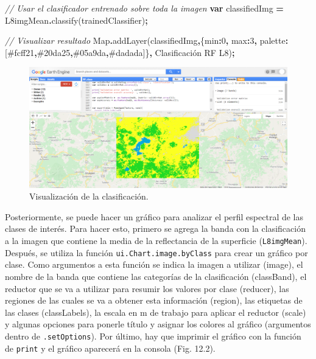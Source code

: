 \documentclass[
  12pt,
  letterpaper,
  twoside]{book}
\newenvironment{Shaded}{\begin{snugshade}}{\end{snugshade}}
\newcommand{\BuiltInTok}[1]{#1}
\newcommand{\CommentTok}[1]{\textcolor[rgb]{0.56,0.35,0.01}{\textit{#1}}}
\newcommand{\DataTypeTok}[1]{\textcolor[rgb]{0.13,0.29,0.53}{#1}}
\newcommand{\DecValTok}[1]{\textcolor[rgb]{0.00,0.00,0.81}{#1}}
\newcommand{\FunctionTok}[1]{\textcolor[rgb]{0.00,0.00,0.00}{#1}}
\newcommand{\KeywordTok}[1]{\textcolor[rgb]{0.13,0.29,0.53}{\textbf{#1}}}
\newcommand{\NormalTok}[1]{#1}
\newcommand{\OperatorTok}[1]{\textcolor[rgb]{0.81,0.36,0.00}{\textbf{#1}}}
\newcommand{\StringTok}[1]{\textcolor[rgb]{0.31,0.60,0.02}{#1}}
\begin{document}
\begin{Shaded}
\begin{Highlighting}[]
\CommentTok{// Usar el clasificador entrenado sobre toda la imagen}
\KeywordTok{var}\NormalTok{ classifiedImg }\OperatorTok{=}\NormalTok{ L8imgMean}\OperatorTok{.}\FunctionTok{classify}\NormalTok{(trainedClassifier)}\OperatorTok{;}

\CommentTok{// Visualizar resultado}
\BuiltInTok{Map}\OperatorTok{.}\FunctionTok{addLayer}\NormalTok{(classifiedImg}\OperatorTok{,}\NormalTok{\{}\DataTypeTok{min}\OperatorTok{:}\DecValTok{0}\OperatorTok{,} \DataTypeTok{max}\OperatorTok{:}\DecValTok{3}\OperatorTok{,} 
  \DataTypeTok{palette}\OperatorTok{:}\NormalTok{[}\StringTok{\textquotesingle{}\#fcff21\textquotesingle{}}\OperatorTok{,}\StringTok{\textquotesingle{}\#20da25\textquotesingle{}}\OperatorTok{,}\StringTok{\textquotesingle{}\#05a9da\textquotesingle{}}\OperatorTok{,}\StringTok{\textquotesingle{}\#dadada\textquotesingle{}}\NormalTok{]\}}\OperatorTok{,}
  \StringTok{\textquotesingle{}Clasificación RF L8\textquotesingle{}}\NormalTok{)}\OperatorTok{;}
\end{Highlighting}
\end{Shaded}

\begin{figure}[btp]

{\centering \includegraphics[width=1\linewidth]{Img/RFClass} 

}

\caption{Visualización de la clasificación.}\label{fig:unnamed-chunk-199}
\end{figure}

Posteriormente, se puede hacer un gráfico para analizar el perfil espectral de las clases de interés. Para hacer esto, primero se agrega la banda con la clasificación a la imagen que contiene la media de la reflectancia de la superficie (\texttt{L8imgMean}). Después, se utiliza la función \texttt{ui.Chart.image.byClass} para crear un gráfico por clase. Como argumentos a esta función se indica la imagen a utilizar (image), el nombre de la banda que contiene las categorías de la clasificación (classBand), el reductor que se va a utilizar para resumir los valores por clase (reducer), las regiones de las cuales se va a obtener esta información (region), las etiquetas de las clases (classLabels), la escala en m de trabajo para aplicar el reductor (scale) y algunas opciones para ponerle título y asignar los colores al gráfico (argumentos dentro de \texttt{.setOptions}). Por último, hay que imprimir el gráfico con la función de \texttt{print} y el gráfico aparecerá en la consola (Fig. 12.2).
\end{document}
